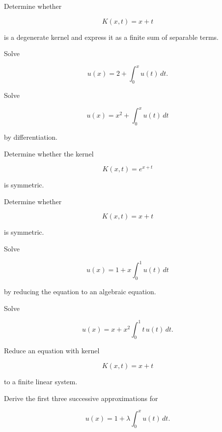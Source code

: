 \begin{exercise}[2]
Determine whether

\[
K(x,t)=x+t
\]

is a degenerate kernel and express it as a finite sum of separable terms.
\end{exercise}

\begin{exercise}[2]
Solve

\[
u(x)
=
2
+
\int_0^x
u(t)\,dt.
\]
\end{exercise}

\begin{exercise}[2]
Solve

\[
u(x)
=
x^2
+
\int_0^x
u(t)\,dt
\]

by differentiation.
\end{exercise}

\begin{exercise}[2]
Determine whether the kernel

\[
K(x,t)=e^{x+t}
\]

is symmetric.
\end{exercise}

\begin{exercise}[2]
Determine whether

\[
K(x,t)=x+t
\]

is symmetric.
\end{exercise}

\begin{exercise}[3]
Solve

\[
u(x)
=
1
+
x
\int_0^1
u(t)\,dt
\]

by reducing the equation to an algebraic equation.
\end{exercise}

\begin{exercise}[3]
Solve

\[
u(x)
=
x
+
x^2
\int_0^1
t\,u(t)\,dt.
\]
\end{exercise}

\begin{exercise}[3]
Reduce an equation with kernel

\[
K(x,t)
=
x+t
\]

to a finite linear system.
\end{exercise}

\begin{exercise}[3]
Derive the first three successive approximations for

\[
u(x)
=
1
+
\lambda
\int_0^x
u(t)\,dt.
\]
\end{exercise}

